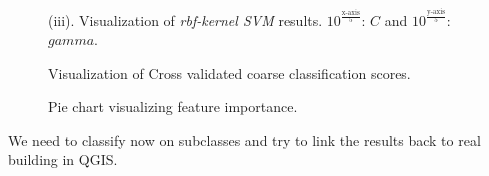 \documentclass[../main.tex]{subfile}
\begin{document}
\begin{figure}[H]
{{\begin{subfloatrow}[1]
                \end{subfloatrow}
            }
            {
                \caption*{(iii). Visualization of \textit{rbf-kernel SVM} results. $10^{\frac{\text{x-axis}}{5}}$: $C$ and $10^{\frac{\text{y-axis}}{5}}$: $gamma$.}
            }
        }
        {
            \caption{\label{fig::class_viz} Visualization of Cross validated coarse classification scores.}
        }
    \end{figure}

    \begin{figure}[H]
        {
            \caption{\label{fig::feat_import} Pie chart visualizing feature importance.}
        }
    \end{figure}

    We need to classify now on subclasses and try to link the results back to real building in QGIS\@.
\end{document}
